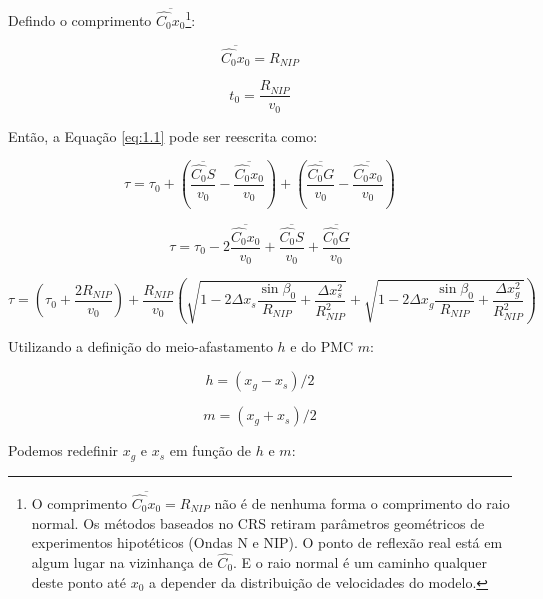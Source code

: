\documentclass[a4paper, 12pt]{article}
\begin{document}
Defindo o comprimento $\overline{\hat{C_0}x_0}$\footnote{O comprimento
$\overline{\hat{C_0}x_0} = R_{NIP}$ não é de nenhuma forma o comprimento do raio normal.
Os métodos baseados no CRS
retiram parâmetros geométricos de experimentos hipotéticos (Ondas N e NIP).
O ponto de reflexão real está em algum lugar na vizinhança de $\hat{C_0}$.
E o raio normal é um caminho qualquer deste ponto até $x_0$ a depender da distribuição de velocidades
do modelo.}:

\begin{equation}
 \label{eq:1.20}
 \overline{\hat{C_0}x_0} = R_{NIP}
\end{equation}

\begin{equation}
 \label{eq:1.21}
t_0 = \frac{R_{NIP}}{v_0}
\end{equation}

Então, a Equação \ref{eq:1.1} pode ser reescrita como:

\begin{equation}
 \label{eq:1.22}
\tau = \tau_0 + \left( \frac{\overline{\hat{C_0}S}}{v_0} - \frac{\overline{\hat{C_0}x_0}}{v_0} \right)
+ \left( \frac{\overline{\hat{C_0}G}}{v_0} - \frac{\overline{\hat{C_0}x_0}}{v_0} \right)
\end{equation}

\begin{equation}
 \label{eq:1.23}
\tau = \tau_0 - 2 \frac{\overline{\hat{C_0}x_0}}{v_0} + \frac{\overline{\hat{C_0}S}}{v_0}
+ \frac{\overline{\hat{C_0}G}}{v_0}
\end{equation}

\begin{equation}
 \label{eq:1.24}
\tau = \left( \tau_0 + \frac{2 R_{NIP}}{v_0} \right)
+ \frac{R_{NIP}}{v_0} \left( \sqrt{  1 - 2 \Delta x_s \frac{\sin{\beta_0}}{R_{NIP}} + \frac{\Delta x_{s}^2}{R_{NIP}^2} }
+ \sqrt{  1 - 2 \Delta x_g \frac{\sin{\beta_0}}{R_{NIP}} + \frac{\Delta x_{g}^2}{R_{NIP}^2} } \right)
\end{equation}

Utilizando a definição do meio-afastamento $h$ e do PMC $m$: 

\begin{equation}
 \label{eq:1.25}
 h=(x_g-x_s)/2
\end{equation}

\begin{equation}
 \label{eq:1.26}
 m=(x_g + x_s)/2
\end{equation}

Podemos redefinir $x_g$ e $x_s$ em função de $h$ e $m$:
\end{document}
